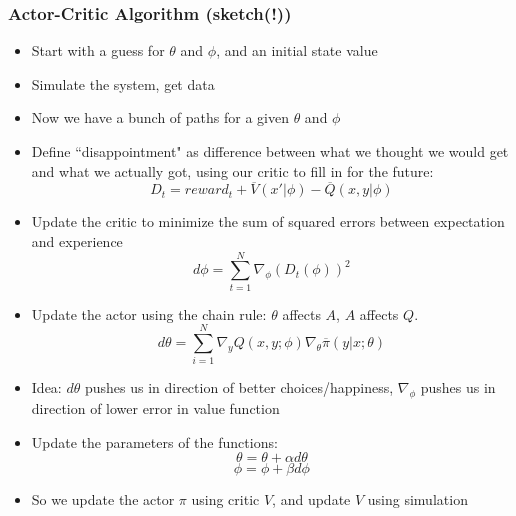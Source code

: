 \documentclass{beamer}
\begin{document}
\begin{frame}
\frametitle[alignment=center]{Actor-Critic Algorithm (\textbf{sketch(!)})}
\begin{itemize}
\footnotesize
\item Start with a guess for $\theta$ and $\phi$, and an initial state value
\item Simulate the system, get data
\item Now we have a bunch of paths for a given $\theta$ and $\phi$
\item Define ``disappointment" as difference between what we thought we would get and what we actually got, using our critic to fill in for the future:
$$D_t=reward_t+\overline{V}(x'|\phi)-\overline{Q}(x,y|\phi)$$
\item Update the critic to minimize the sum of squared errors between expectation and experience
$$d\phi=\sum_{t=1}^N\nabla_{\phi}(D_t(\phi))^2$$
\item Update the actor using the chain rule: $\theta$ affects $A$, $A$ affects $Q$.
$$d\theta=\sum_{i=1}^N\nabla_yQ(x,y;\phi)\nabla_\theta \overline{\pi}(y|x;\theta)  $$
\item Idea:  $d\theta$ pushes us in direction of better choices/happiness, $\nabla_{\phi}$ pushes us in direction of lower error in value function
\item Update the parameters of the functions:
$$\theta=\theta+\alpha d\theta$$
$$\phi=\phi+\beta d\phi$$
\item So we update the actor $\pi$ using critic $V$, and update $V$ using simulation
\end{itemize}
\end{frame}
\end{document}
